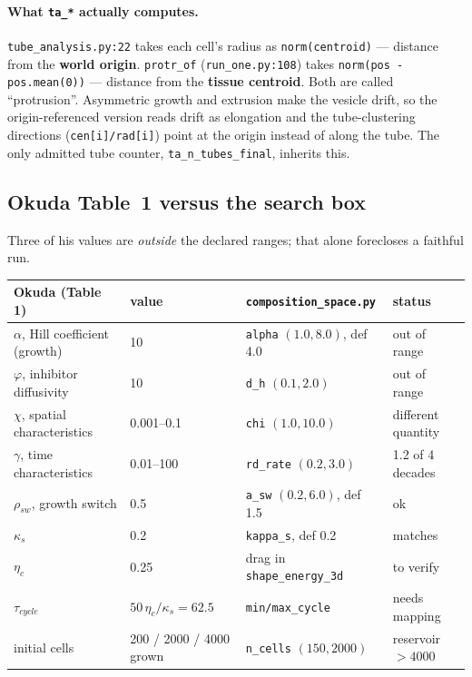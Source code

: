 \documentclass[11pt]{article}
\newcommand{\code}[1]{\texttt{#1}}
\newcommand{\op}[1]{\textcolor{cop}{\texttt{#1}}}
\begin{document}
{\paragraph{What \code{ta\_*} actually computes.} \code{tube\_analysis.py:22} takes each cell's
radius as \code{norm(centroid)} --- distance from the \textbf{world origin}. \code{protr\_of}
(\code{run\_one.py:108}) takes \code{norm(pos - pos.mean(0))} --- distance from the \textbf{tissue
centroid}. Both are called ``protrusion''. Asymmetric growth and extrusion make the vesicle drift,
so the origin-referenced version reads drift as elongation and the tube-clustering directions
(\code{cen[i]/rad[i]}) point at the origin instead of along the tube. The only admitted tube
counter, \code{ta\_n\_tubes\_final}, inherits this.

\subsection{Okuda Table~1 versus the search box}

Three of his values are \emph{outside} the declared ranges; that alone forecloses a faithful run.

\begin{center}\footnotesize
\begin{tabular}{@{}l l l l@{}}
\toprule
\textbf{Okuda (Table 1)} & \textbf{value} & \textbf{\code{composition\_space.py}} & \textbf{status}\\
\midrule
$\alpha$, Hill coefficient (growth)  & 10          & \code{alpha} $(1.0,8.0)$, def 4.0 & \textcolor{cop}{out of range}\\
$\varphi$, inhibitor diffusivity     & 10          & \code{d\_h} $(0.1,2.0)$           & \textcolor{cop}{out of range}\\
$\chi$, spatial characteristics      & 0.001--0.1  & \code{chi} $(1.0,10.0)$           & \textcolor{cop}{different quantity}\\
$\gamma$, time characteristics       & 0.01--100   & \code{rd\_rate} $(0.2,3.0)$       & \textcolor{cop}{1.2 of 4 decades}\\
$\rho_{sw}$, growth switch           & 0.5         & \code{a\_sw} $(0.2,6.0)$, def 1.5 & ok\\
$\kappa_s$                           & 0.2         & \code{kappa\_s}, def 0.2          & matches\\
$\eta_c$                             & 0.25        & drag in \op{shape\_energy\_3d}    & to verify\\
$\tau_{cycle}$                       & $50\,\eta_c/\kappa_s = 62.5$ & \code{min/max\_cycle} & needs mapping\\
initial cells                        & 200 / 2000 / 4000 grown & \code{n\_cells} $(150,2000)$ & reservoir $>4000$\\
\bottomrule
\end{tabular}
\end{center}

}
\end{document}
